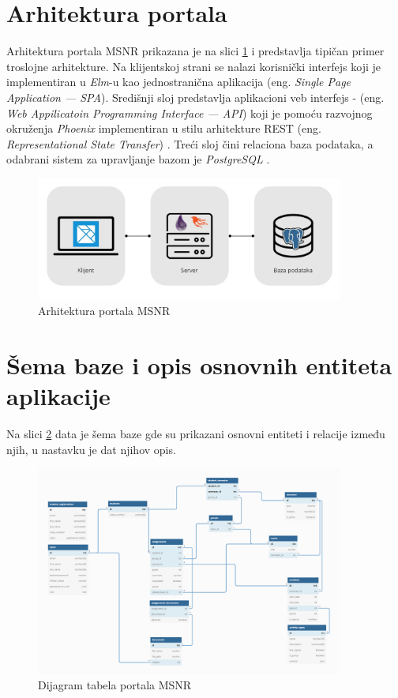 \documentclass[12pt,oneside]{memoir}
\begin{document}
\section{Arhitektura portala}
Arhitektura portala MSNR prikazana je na slici \ref{fig:msnr-arch} i predstavlja tipičan primer troslojne arhitekture.
Na klijentskoj strani se nalazi korisnički interfejs koji je implementiran u \emph{Elm}-u kao jednostranična aplikacija (eng. \emph{Single Page Application --- SPA}).
Središnji sloj predstavlja aplikacioni veb interfejs - (eng. \emph{Web Appilicatoin Programming Interface --- API})
koji je pomoću razvojnog okruženja \emph{Phoenix} \cite{phoenix} implementiran u stilu arhitekture REST (eng. \emph{Representational State Transfer}) \cite{rest}.
Treći sloj čini relaciona baza podataka, a odabrani sistem za upravljanje bazom je \emph{PostgreSQL} \cite{psql} .
\begin{figure}[!ht]
  \centering
  \includegraphics[width=0.9\textwidth]{msnr-arch.png}
  \caption{Arhitektura portala MSNR}
  \label{fig:msnr-arch}
\end{figure}

\section{Šema baze i opis osnovnih entiteta aplikacije}
Na slici \ref{fig:msnr-db} data je šema baze gde su prikazani osnovni entiteti i relacije između njih, u nastavku je dat njihov opis.
\begin{figure}[!ht]
  \centering
  \includegraphics[width=0.9\textwidth]{msnr-db.png}
  \caption{Dijagram tabela portala MSNR}
  \label{fig:msnr-db}
\end{figure}
\end{document}
